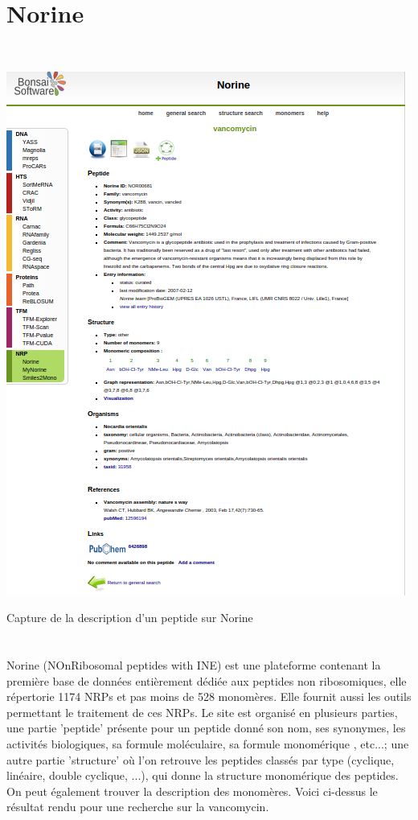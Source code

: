 \documentclass[a4paper,10pt]{report}
\begin{document}
	
	  
      \section{Norine}
	 ~\\
	 \begin{minipage}[c]{\textwidth}
	    \centering
	     \includegraphics[scale =0.7]{image/Norine.png}
	      \caption{Capture de la description d'un peptide sur Norine}
	 \end{minipage}
	 
	  \paragraph{}

	  \\Norine (NOnRibosomal peptides with INE) est une plateforme contenant la première base de données entièrement dédiée aux peptides non ribosomiques, elle répertorie 1174 NRPs et pas moins de 528 monomères. Elle fournit aussi les outils permettant le traitement de ces NRPs. 
	  Le site est organisé en plusieurs parties, une partie 'peptide' présente pour un peptide donné son nom, ses synonymes, les activités biologiques, sa formule moléculaire, sa formule monomérique , etc...; une autre partie 'structure' où l'on retrouve les peptides classés par type (cyclique, linéaire, double cyclique, ...), qui donne la structure monomérique des peptides.
	  On peut également trouver la description des monomères. 
	  Voici ci-dessus le résultat rendu pour une recherche sur la vancomycin.
	
\end{document}
